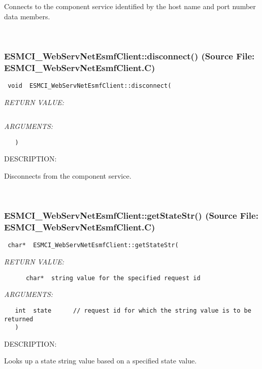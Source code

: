      Connects to the component service identified by the host name and port
      number data members.
   
 
\mbox{}\hrulefill\
 
\subsubsection{ESMCI\_WebServNetEsmfClient::disconnect() (Source File: ESMCI\_WebServNetEsmfClient.C)}


  
\begin{verbatim} void  ESMCI_WebServNetEsmfClient::disconnect(\end{verbatim}{\em RETURN VALUE:}
\begin{verbatim} \end{verbatim}{\em ARGUMENTS:}
\begin{verbatim}   )\end{verbatim}
{\sf DESCRIPTION:\\ }


      Disconnects from the component service.
   
 
\mbox{}\hrulefill\
 
\subsubsection{ESMCI\_WebServNetEsmfClient::getStateStr() (Source File: ESMCI\_WebServNetEsmfClient.C)}


  
\begin{verbatim} char*  ESMCI_WebServNetEsmfClient::getStateStr(\end{verbatim}{\em RETURN VALUE:}
\begin{verbatim}      char*  string value for the specified request id\end{verbatim}{\em ARGUMENTS:}
\begin{verbatim}   int  state      // request id for which the string value is to be returned
   )\end{verbatim}
{\sf DESCRIPTION:\\ }


      Looks up a state string value based on a specified state value.
   
